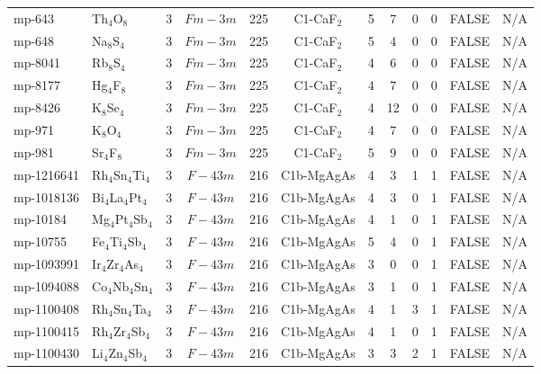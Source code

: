 {\begin{longtable}{llcccccccccc}
    mp-643 & Th$_{4}$O$_{8}$ & 3     & $Fm-3m$ & 225   & C1-CaF$_{2}$ & 5     & 7     & 0     & 0     & FALSE & N/A \\
    mp-648 & Na$_{8}$S$_{4}$ & 3     & $Fm-3m$ & 225   & C1-CaF$_{2}$ & 5     & 4     & 0     & 0     & FALSE & N/A \\
    mp-8041 & Rb$_{8}$S$_{4}$ & 3     & $Fm-3m$ & 225   & C1-CaF$_{2}$ & 4     & 6     & 0     & 0     & FALSE & N/A \\
    mp-8177 & Hg$_{4}$F$_{8}$ & 3     & $Fm-3m$ & 225   & C1-CaF$_{2}$ & 4     & 7     & 0     & 0     & FALSE & N/A \\
    mp-8426 & K$_{8}$Se$_{4}$ & 3     & $Fm-3m$ & 225   & C1-CaF$_{2}$ & 4     & 12    & 0     & 0     & FALSE & N/A \\
    mp-971 & K$_{8}$O$_{4}$ & 3     & $Fm-3m$ & 225   & C1-CaF$_{2}$ & 4     & 7     & 0     & 0     & FALSE & N/A \\
    mp-981 & Sr$_{4}$F$_{8}$ & 3     & $Fm-3m$ & 225   & C1-CaF$_{2}$ & 5     & 9     & 0     & 0     & FALSE & N/A \\
    mp-1216641 & Rh$_{4}$Sn$_{4}$Ti$_{4}$ & 3     & $F-43m$ & 216   & C1b-MgAgAs & 4     & 3     & 1     & 1     & FALSE & N/A \\
    mp-1018136 & Bi$_{4}$La$_{4}$Pt$_{4}$ & 3     & $F-43m$ & 216   & C1b-MgAgAs & 4     & 3     & 0     & 1     & FALSE & N/A \\
    mp-10184 & Mg$_{4}$Pt$_{4}$Sb$_{4}$ & 3     & $F-43m$ & 216   & C1b-MgAgAs & 4     & 1     & 0     & 1     & FALSE & N/A \\
    mp-10755 & Fe$_{4}$Ti$_{4}$Sb$_{4}$ & 3     & $F-43m$ & 216   & C1b-MgAgAs & 5     & 4     & 0     & 1     & FALSE & N/A \\
    mp-1093991 & Ir$_{4}$Zr$_{4}$As$_{4}$ & 3     & $F-43m$ & 216   & C1b-MgAgAs & 3     & 0     & 0     & 1     & FALSE & N/A \\
    mp-1094088 & Co$_{4}$Nb$_{4}$Sn$_{4}$ & 3     & $F-43m$ & 216   & C1b-MgAgAs & 3     & 1     & 0     & 1     & FALSE & N/A \\
    mp-1100408 & Rh$_{4}$Sn$_{4}$Ta$_{4}$ & 3     & $F-43m$ & 216   & C1b-MgAgAs & 4     & 1     & 3     & 1     & FALSE & N/A \\
    mp-1100415 & Rh$_{4}$Zr$_{4}$Sb$_{4}$ & 3     & $F-43m$ & 216   & C1b-MgAgAs & 4     & 1     & 0     & 1     & FALSE & N/A \\
    mp-1100430 & Li$_{4}$Zn$_{4}$Sb$_{4}$ & 3     & $F-43m$ & 216   & C1b-MgAgAs & 3     & 3     & 2     & 1     & FALSE & N/A \\

\end{longtable}}
